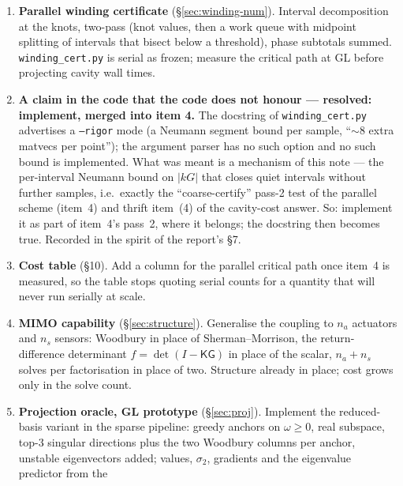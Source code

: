 \documentclass[11pt,a4paper]{article}
\newcommand{\code}[1]{\texttt{#1}}
\newcommand{\tp}{^{\mathsf T}}   %
\begin{document}
{\begin{enumerate}[leftmargin=1.8em,itemsep=2pt]
\textbf{Beyn}, per \S\ref{sec:contour}.  Prototype at GL against the dense count that
\code{plant\_pole\_data} already provides.  \emph{For the step} (\S\ref{sec:bfs}) the rectangle
uses the inertia certificate as here, with a sparse $LDL\tp$ in place of Lanczos (bisection on
$\sigma$), and the tiles are exhausted by nearest-$k$ shift-invert instead of Beyn; Beyn
remains the engine to decide for the cavity.
\item \textbf{Parallel winding certificate} (\S\ref{sec:winding-num}).
Interval decomposition at the knots, two-pass (knot values, then a work queue with
midpoint splitting of intervals that bisect below a threshold), phase subtotals summed.
\code{winding\_cert.py} is serial as frozen; measure the critical path at GL before
projecting cavity wall times.
\item \textbf{A claim in the code that the code does not honour --- resolved: implement,
merged into item 4.}  The docstring of \code{winding\_cert.py} advertises a
\code{--rigor} mode (a Neumann segment bound per sample, ``$\sim8$ extra matvecs per
point''); the argument parser has no such option and no such bound is implemented.
What was meant is a mechanism of this note --- the per-interval Neumann bound on $|kG|$
that closes quiet intervals without further samples, i.e.\ exactly the
``coarse-certify'' pass-2 test of the parallel scheme (item~4) and thrift item~(4) of
the cavity-cost answer.  So: implement it as part of item~4's pass~2, where it belongs;
the docstring then becomes true.  Recorded in the spirit of the report's \S7.
\item \textbf{Cost table} (\S10).  Add a column for the parallel critical path once
item~4 is measured, so the table stops quoting serial counts for a quantity that will
never run serially at scale.
\item \textbf{MIMO capability} (\S\ref{sec:structure}).  Generalise the
coupling to $n_a$ actuators and $n_s$ sensors: Woodbury in place of Sherman--Morrison,
the return-difference determinant $f=\det(I-\mathsf K\mathsf G)$ in place of the scalar,
$n_a{+}n_s$ solves per factorisation in place of two.  Structure already in place; cost
grows only in the solve count.
\item \textbf{Projection oracle, GL prototype} (\S\ref{sec:proj}).  Implement the
reduced-basis variant in the sparse pipeline: greedy anchors on $\omega\ge0$, real
subspace, top-3 singular directions plus the two Woodbury columns per anchor, unstable
eigenvectors added; values, $\sigma_2$, gradients and the eigenvalue predictor from the

\end{enumerate}}
\end{document}
